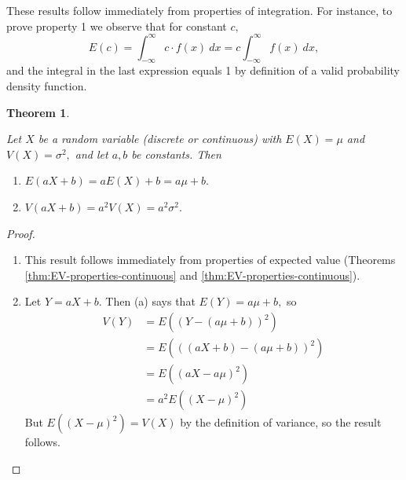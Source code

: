 \documentclass[
]{book}
\providecommand{\tightlist}{%
  \setlength{\itemsep}{0pt}\setlength{\parskip}{0pt}}
\newtheorem{theorem}{Theorem}[chapter]
\theoremstyle{definition}
\theoremstyle{definition}
\theoremstyle{definition}
\theoremstyle{definition}
\theoremstyle{remark}
\begin{document}
These results follow immediately from properties of integration. For instance, to prove property 1 we observe
that for constant \(c,\)
\[E(c) = \int_{-\infty}^\infty c\cdot f(x)~ dx  = c \int_{-\infty}^\infty f(x)~ dx,\]
and the integral in the last expression equals 1 by definition of a valid probability density function.

\begin{theorem}
\protect\hypertarget{thm:EV-linear-props}{}\label{thm:EV-linear-props}

Let \(X\) be a random variable (discrete or continuous) with \(E(X) = \mu\) and \(V(X) = \sigma^2,\) and let \(a, b\) be constants. Then

\begin{enumerate}
\def\labelenumi{\alph{enumi})}
\tightlist
\item
  \(\displaystyle E(aX + b) = aE(X) + b = a \mu + b.\)
\item
  \(\displaystyle V(aX + b) = a^2V(X) = a^2 \sigma^2.\)
\end{enumerate}

\end{theorem}

\begin{proof}
\leavevmode

\begin{enumerate}
\def\labelenumi{\alph{enumi})}
\item
  This result follows immediately from properties of expected value (Theorems \ref{thm:EV-properties-continuous} and \ref{thm:EV-properties-continuous}).
\item
  Let \(Y = aX + b\). Then (a) says that \(E(Y) = a \mu + b,\) so
  \begin{align*}
  V(Y) &= E((Y-(a\mu + b))^2) \\
   &= E\left(((aX+b)-(a\mu + b))^2\right)\\
   &= E\left((aX-a\mu)^2\right)\\
   &= a^2 E\left((X-\mu)^2\right)
  \end{align*}
  But \(E\left((X-\mu)^2\right)=V(X)\) by the definition of variance, so the result follows.
\end{enumerate}

\end{proof}
\end{document}
